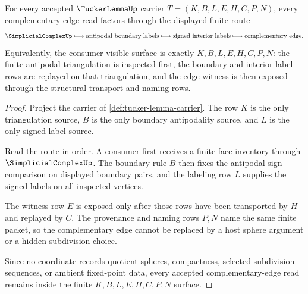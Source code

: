 \begin{theorem}
\label{thm:tucker-lemma-finite-complementary-edge-route}
For every accepted $\TuckerLemmaUp$ carrier $T=(K,B,L,E,H,C,P,N)$, every complementary-edge read factors through the displayed finite route
$$
\SimplicialComplexUp
\longmapsto
\text{antipodal boundary labels}
\longmapsto
\text{signed interior labels}
\longmapsto
\text{complementary edge}.
$$
Equivalently, the consumer-visible surface is exactly $K,B,L,E,H,C,P,N$: the finite antipodal triangulation is inspected first, the boundary and interior label rows are replayed on that triangulation, and the edge witness is then exposed through the structural transport and naming rows.
\end{theorem}
\begin{proof}
Project the carrier of \autoref{def:tucker-lemma-carrier}. The row $K$ is the only triangulation source, $B$ is the only boundary antipodality source, and $L$ is the only signed-label source.

Read the route in order. A consumer first receives a finite face inventory through $\SimplicialComplexUp$. The boundary rule $B$ then fixes the antipodal sign comparison on displayed boundary pairs, and the labeling row $L$ supplies the signed labels on all inspected vertices.

The witness row $E$ is exposed only after those rows have been transported by $H$ and replayed by $C$. The provenance and naming rows $P,N$ name the same finite packet, so the complementary edge cannot be replaced by a host sphere argument or a hidden subdivision choice.

Since no coordinate records quotient spheres, compactness, selected subdivision sequences, or ambient fixed-point data, every accepted complementary-edge read remains inside the finite $K,B,L,E,H,C,P,N$ surface.
\end{proof}

